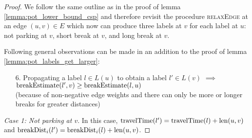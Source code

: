 \begin{proof}
	We follow the same outline as in the proof of lemma \ref{lemma:pot_lower_bound_csp} and therefore revisit the procedure \textsc{relaxEdge} at an edge $(u,v) \in E$ which now can produce three labels at $v$ for each label at $u$: not parking at $v$, short break at $v$, and long break at $v$.

	Following general observations can be made in an addition to the proof of lemma \ref{lemma:pot_labels_get_larger}:

	\begin{enumerate}
		\item[6.] Propagating a label $l \in L(u)$ to obtain a label $l' \in L(v)$ $\implies$ $\operatorname{breakEstimate}(l',v) \ge \operatorname{breakEstimate}(l,u)$\\(because of non-negative edge weights and there can only be more or longer breaks for greater distances)
	\end{enumerate}

	\emph{Case 1: Not parking at $v$}. In this case, $\operatorname{travelTime}(l') = \operatorname{travelTime}(l) + \operatorname{len}(u,v)$ and $\operatorname{breakDist}_i(l') = \operatorname{breakDist}_i(l) + \operatorname{len}(u,v)$.


\end{proof}
